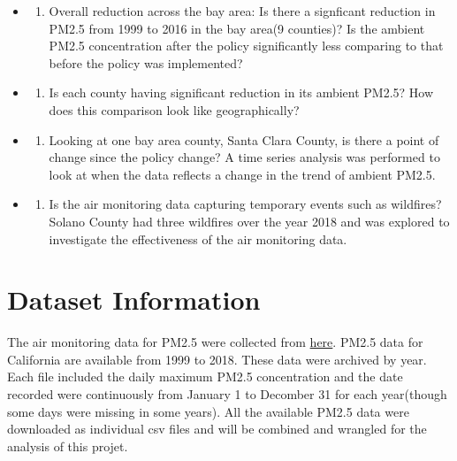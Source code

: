 \documentclass[12pt,]{article}
\providecommand{\tightlist}{%
  \setlength{\itemsep}{0pt}\setlength{\parskip}{0pt}}
\begin{document}
\begin{itemize}
\item
  \begin{enumerate}
  \def\labelenumi{\arabic{enumi}.}
  \tightlist
  \item
    Overall reduction across the bay area: Is there a signficant
    reduction in PM2.5 from 1999 to 2016 in the bay area(9 counties)? Is
    the ambient PM2.5 concentration after the policy significantly less
    comparing to that before the policy was implemented?
  \end{enumerate}
\item
  \begin{enumerate}
  \def\labelenumi{\arabic{enumi}.}
  \setcounter{enumi}{1}
  \tightlist
  \item
    Is each county having significant reduction in its ambient PM2.5?
    How does this comparison look like geographically?
  \end{enumerate}
\item
  \begin{enumerate}
  \def\labelenumi{\arabic{enumi}.}
  \setcounter{enumi}{2}
  \tightlist
  \item
    Looking at one bay area county, Santa Clara County, is there a point
    of change since the policy change? A time series analysis was
    performed to look at when the data reflects a change in the trend of
    ambient PM2.5.
  \end{enumerate}
\item
  \begin{enumerate}
  \def\labelenumi{\arabic{enumi}.}
  \setcounter{enumi}{3}
  \tightlist
  \item
    Is the air monitoring data capturing temporary events such as
    wildfires? Solano County had three wildfires over the year 2018 and
    was explored to investigate the effectiveness of the air monitoring
    data.
  \end{enumerate}
\end{itemize}

\newpage

\section{Dataset Information}\label{dataset-information}

The air monitoring data for PM2.5 were collected from
\href{https://www.epa.gov/outdoor-air-quality-data/download-daily-data}{here}.
PM2.5 data for California are available from 1999 to 2018. These data
were archived by year. Each file included the daily maximum PM2.5
concentration and the date recorded were continuously from January 1 to
Decomber 31 for each year(though some days were missing in some years).
All the available PM2.5 data were downloaded as individual csv files and
will be combined and wrangled for the analysis of this projet.
\end{document}
